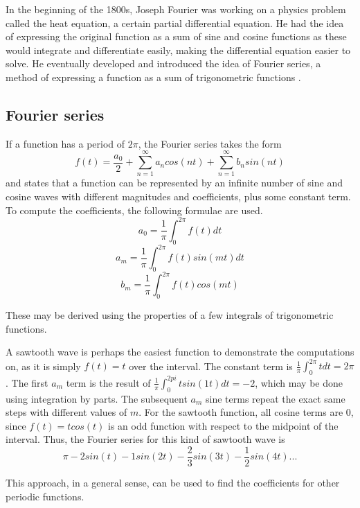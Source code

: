 In the beginning of the 1800s, Joseph Fourier was working on a physics problem called the heat equation, a certain partial differential equation. He had the idea of expressing the original function as a sum of sine and cosine functions as these would integrate and differentiate easily, making the differential equation easier to solve. He eventually developed and introduced the idea of Fourier series, a method of expressing a function as a sum of trigonometric functions \cite{Bounchaleun2019}.

\subsection{Fourier series} 
If a function has a period of $2\pi$, the Fourier series takes the form $$f(t) = \frac{a_0}{2} + \sum_{n=1}^{\infty}a_ncos(nt)+\sum_{n=1}^{\infty}b_nsin(nt)$$ and states that a function can be represented by an infinite number of sine and cosine waves with different magnitudes and coefficients, plus some constant term. To compute the coefficients, the following formulae are used.
$$a_0 = \frac{1}{\pi}\int_0^{2\pi} f(t)dt$$
$$a_m = \frac{1}{\pi}\int_0^{2\pi} f(t) sin(mt)dt$$
$$b_m = \frac{1}{\pi}\int_0^{2\pi} f(t) cos(mt)$$

These may be derived using the properties of a few integrals of trigonometric functions.

A sawtooth wave is perhaps the easiest function to demonstrate the computations on, as it is simply $f(t) = t$ over the interval. The constant term is $\frac{1}{\pi}\int_0^{2\pi} t dt = 2\pi$. The first $a_m$ term is the result of $\frac{1}{\pi}\int_0^{2pi} t sin(1t)dt = -2$, which may be done using integration by parts. The subsequent $a_m$ sine terms repeat the exact same steps with different values of $m$. For the sawtooth function, all cosine terms are 0, since $f(t)=tcos(t)$ is an odd function with respect to the midpoint of the interval. Thus, the Fourier series for this kind of sawtooth wave is
$$\pi -2sin(t) -1sin(2t)-\frac{2}{3}sin(3t) - \frac{1}{2}sin(4t) ...$$

This approach, in a general sense, can be used to find the coefficients for other periodic functions. 


